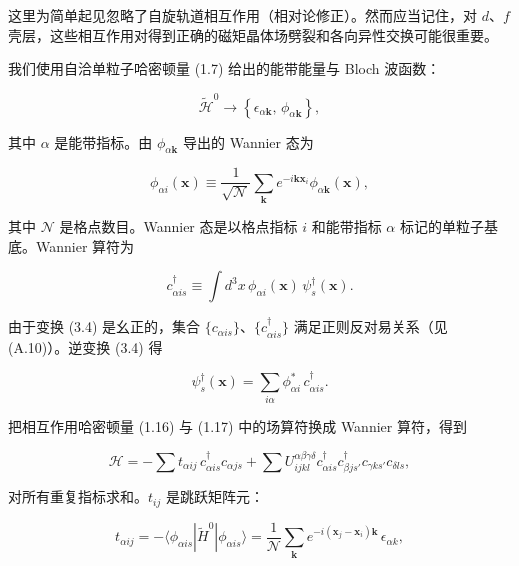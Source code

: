 这里为简单起见忽略了自旋轨道相互作用（相对论修正）。然而应当记住，对 $d$、$f$ 壳层，这些相互作用对得到正确的磁矩晶体场劈裂和各向异性交换可能很重要。

我们使用自洽单粒子哈密顿量 (1.7) 给出的能带能量与 Bloch 波函数：

\begin{equation*}
\tilde {\mathcal {H}} ^ {0} \rightarrow \left\{ \epsilon_ {\alpha \mathbf {k}}, \, \phi_ {\alpha \mathbf {k}} \right\},
\tag{3.2}
\end{equation*}

其中 $\alpha$ 是能带指标。由 $\phi_{\alpha \mathbf{k}}$ 导出的 Wannier 态为

\begin{equation*}
\phi_ {\alpha i} (\mathbf {x}) \equiv \frac {1}{\sqrt {\mathcal {N}}} \sum_ {\mathbf {k}} e ^ {- i \mathbf {kx} _ {i}} \phi_ {\alpha \mathbf {k}} (\mathbf {x}),
\tag{3.3}
\end{equation*}

其中 $\mathcal{N}$ 是格点数目。Wannier 态是以格点指标 $i$ 和能带指标 $\alpha$ 标记的单粒子基底。Wannier 算符为

\begin{equation*}
c _ {\alpha is} ^ {\dagger} \equiv \int d ^ {3} x \, \phi_ {\alpha i} (\mathbf {x}) \, \psi_ {s} ^ {\dagger} (\mathbf {x}).
\tag{3.4}
\end{equation*}

由于变换 (3.4) 是幺正的，集合 $\{c_{\alpha is}\}$、$\{c_{\alpha is}^{\dagger}\}$ 满足正则反对易关系（见 (A.10)）。逆变换 (3.4) 得

\begin{equation*}
\psi_ {s} ^ {\dagger} (\mathbf {x}) = \sum_ {i \alpha} \phi_ {\alpha i} ^ {*} \, c _ {\alpha is} ^ {\dagger}.
\tag{3.5}
\end{equation*}

把相互作用哈密顿量 (1.16) 与 (1.17) 中的场算符换成 Wannier 算符，得到

\begin{equation*}
\mathcal {H} = - \sum t _ {\alpha ij} \, c _ {\alpha is} ^ {\dagger} c _ {\alpha js} + \sum U _ {ijkl} ^ {\alpha \beta \gamma \delta} c _ {\alpha is} ^ {\dagger} c _ {\beta js'} ^ {\dagger} c _ {\gamma ks'} c _ {\delta ls},
\tag{3.6}
\end{equation*}

对所有重复指标求和。$t_{ij}$ 是跳跃矩阵元：

\begin{equation*}
t _ {\alpha ij} = - \langle \phi_ {\alpha is} | \tilde {H} ^ {0} | \phi_ {\alpha is} \rangle = \frac {1}{\mathcal {N}} \sum_ {\mathbf {k}} e ^ {- i (\mathbf {x} _ {j} - \mathbf {x} _ {i}) \mathbf {k}} \, \epsilon_ {\alpha k},
\tag{3.7}
\end{equation*}

